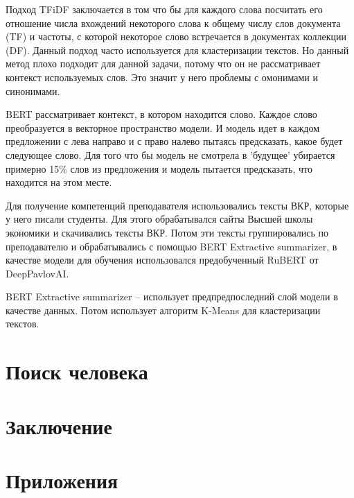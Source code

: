 \documentclass[PI,KR]{HSEUniversity}
\begin{document}
Подход TFiDF заключается в том что бы для каждого слова посчитать его отношение числа вхождений некоторого слова к общему числу слов документа (TF) и частоты, с которой некоторое слово встречается в документах коллекции (DF). Данный подход часто используется для кластеризации текстов. Но данный метод плохо подходит для данной задачи, потому что он не рассматривает контекст используемых слов. Это значит у него проблемы с омонимами и синонимами.

BERT рассматривает контекст, в котором находится слово. Каждое слово преобразуется в векторное пространство модели. И модель идет в каждом предложении с лева направо и с право налево пытаясь предсказать, какое будет следующее слово. Для того что бы модель не смотрела в 'будущее' убирается примерно 15\% слов из предложения и модель пытается предсказать, что находится на этом месте.

Для получение компетенций преподавателя использовались тексты ВКР, которые у него писали студенты. Для этого обрабатывался сайты Высшей школы экономики и скачивались тексты ВКР. Потом эти тексты группировались по преподавателю и обрабатывались с помощью BERT Extractive summarizer, в качестве модели для обучения использовался предобученный RuBERT от DeepPavlovAI. 

BERT Extractive summarizer -- использует предпредпоследний слой модели в качестве данных. Потом использует алгоритм K-Means для кластеризации текстов.
\chapter{Поиск человека}

\chapter*{Заключение}
\putbibliography %

\chapter*{Приложения}
\end{document}
